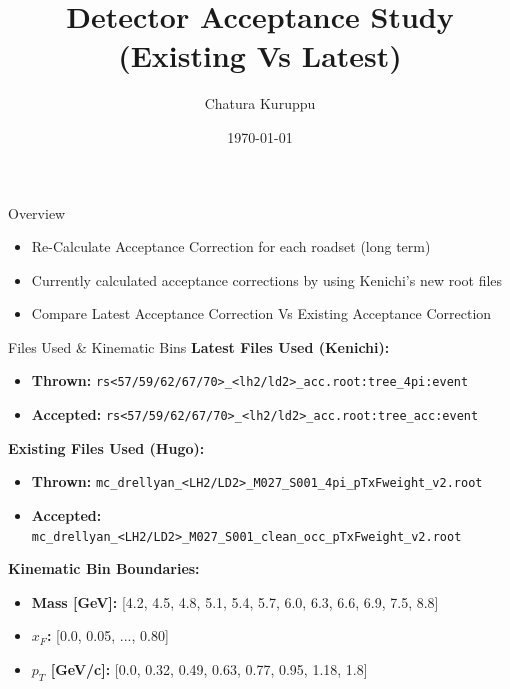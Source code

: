 \documentclass[aspectratio=169]{beamer}
\title{Detector Acceptance Study \\ (Existing Vs Latest)}
\author{Chatura Kuruppu}
\institute{New Mexico State University}
\date{\today}
\begin{document}
\begin{frame}
    \titlepage
\end{frame}

\begin{frame}{Overview}
    \begin{itemize}
        \item Re-Calculate Acceptance Correction for each roadset (long term)
        \item Currently calculated acceptance corrections by using Kenichi's new root files
        \item Compare Latest Acceptance Correction Vs Existing Acceptance Correction
    \end{itemize}
\end{frame}

\begin{frame}{Files Used \& Kinematic Bins}
    \small
    \textbf{Latest Files Used (Kenichi):}
    \begin{itemize}
        \item \textbf{Thrown:} \texttt{rs<57/59/62/67/70>\_<lh2/ld2>\_acc.root:tree\_4pi:event}
        \item \textbf{Accepted:} \texttt{rs<57/59/62/67/70>\_<lh2/ld2>\_acc.root:tree\_acc:event}
    \end{itemize}
    \vspace{0.1cm}
    \textbf{Existing Files Used (Hugo):}
    \begin{itemize}
        \item \textbf{Thrown:} \texttt{mc\_drellyan\_<LH2/LD2>\_M027\_S001\_4pi\_pTxFweight\_v2.root}
        \item \textbf{Accepted:} \texttt{mc\_drellyan\_<LH2/LD2>\_M027\_S001\_clean\_occ\_pTxFweight\_v2.root}
    \end{itemize}
    \vspace{0.1cm}
    \textbf{Kinematic Bin Boundaries:}
    \begin{itemize}
        \item \textbf{Mass [GeV]:} [4.2, 4.5, 4.8, 5.1, 5.4, 5.7, 6.0, 6.3, 6.6, 6.9, 7.5, 8.8]
        \item \textbf{$x_F$:} [0.0, 0.05, ..., 0.80]
        \item \textbf{$p_T$ [GeV/c]:} [0.0, 0.32, 0.49, 0.63, 0.77, 0.95, 1.18, 1.8]
    \end{itemize}
\end{frame}
\end{document}
